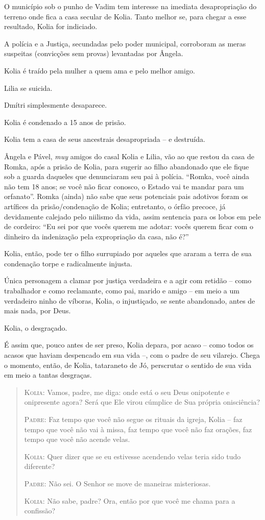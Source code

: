 O município sob o punho de Vadim tem interesse na imediata
desapropriação do terreno onde fica a casa secular de Kolia. Tanto
melhor se, para chegar a esse resultado, Kolia for indiciado.

A polícia e a Justiça, secundadas pelo poder municipal, corroboram as
meras suspeitas (convicções sem provas) levantadas por Ângela.

Kolia é traído pela mulher a quem ama e pelo melhor amigo.

Lilia se suicida.

Dmítri simplesmente desaparece.

Kolia é condenado a 15 anos de prisão.

Kolia tem a casa de seus ancestrais desapropriada -- e destruída.

Ângela e Pável, \emph{muy} amigos do casal Kolia e Lilia, vão ao que
restou da casa de Romka, após a prisão de Kolia, para sugerir ao filho
abandonado que ele fique sob a guarda daqueles que denunciaram seu pai à
polícia. ``Romka, você ainda não tem 18 anos; se você não ficar conosco,
o Estado vai te mandar para um orfanato''. Romka (ainda) não sabe que
seus potenciais pais adotivos foram os artífices da prisão/condenação de
Kolia; entretanto, o órfão precoce, já devidamente calejado pelo
niilismo da vida, assim sentencia para os lobos em pele de cordeiro:
``Eu sei por que vocês querem me adotar: vocês querem ficar com o
dinheiro da indenização pela expropriação da casa, não é?''

Kolia, então, pode ter o filho surrupiado por aqueles que araram a terra
de sua condenação torpe e radicalmente injusta.

Única personagem a clamar por justiça verdadeira e a agir com retidão --
como trabalhador e como reclamante, como pai, marido e amigo -- em meio
a um verdadeiro ninho de víboras, Kolia, o injustiçado, se sente
abandonado, antes de mais nada, por Deus.

Kolia, o desgraçado.

É assim que, pouco antes de ser preso, Kolia depara, por acaso -- como
todos os acasos que haviam despencado em sua vida --, com o padre de seu
vilarejo. Chega o momento, então, de Kolia, tataraneto de Jó, perscrutar
o sentido de sua vida em meio a tantas desgraças.

\begin{quote}
\forceindent{}\textsc{Kolia:} Vamos, padre, me diga: onde está o seu Deus onipotente e
onipresente agora? Será que Ele virou cúmplice de Sua própria
onisciência?

\textsc{Padre:} Faz tempo que você não segue os rituais da igreja, Kolia
-- faz tempo que você não vai à missa, faz tempo que você não faz
orações, faz tempo que você não acende velas.

\textsc{Kolia:} Quer dizer que se eu estivesse acendendo velas teria
sido tudo diferente?

\textsc{Padre:} Não sei. O Senhor se move de maneiras misteriosas.

\textsc{Kolia:} Não sabe, padre? Ora, então por que você me chama para a
confissão?
\end{quote}

